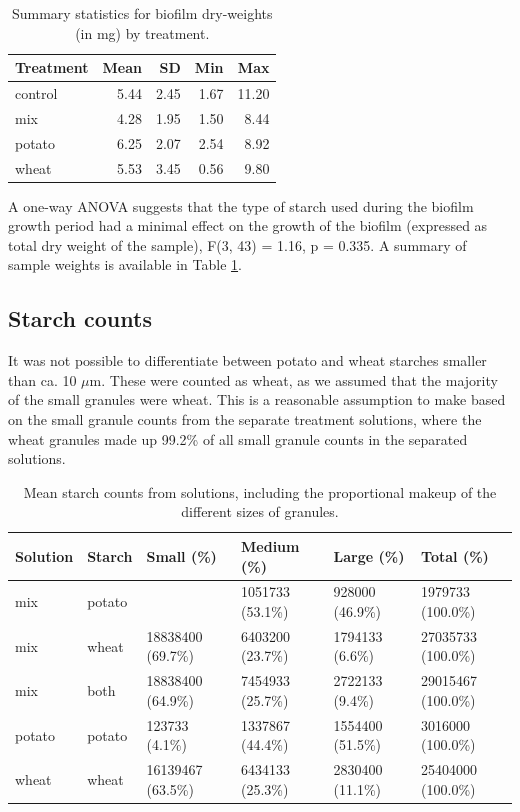 \documentclass[
]{article}
\begin{document}
\begin{table}

\caption{\label{tab:anova-tbl}Summary statistics for biofilm dry-weights (in mg) by treatment.}
\centering
\begin{tabular}[t]{l|r|r|r|r}
\hline
Treatment & Mean & SD & Min & Max\\
\hline
control & 5.44 & 2.45 & 1.67 & 11.20\\
\hline
mix & 4.28 & 1.95 & 1.50 & 8.44\\
\hline
potato & 6.25 & 2.07 & 2.54 & 8.92\\
\hline
wheat & 5.53 & 3.45 & 0.56 & 9.80\\
\hline
\end{tabular}
\end{table}

A one-way ANOVA suggests that the type of starch used during the biofilm
growth period had a minimal effect on the growth of the biofilm
(expressed as total dry weight of the sample), F(3, 43)
= 1.16, p = 0.335.
A summary of sample weights is available in Table \ref{tab:anova-tbl}.

\hypertarget{starch-counts}{%
\subsection{Starch counts}\label{starch-counts}}

It was not possible to differentiate between potato and
wheat starches smaller than ca. 10 \(\mu\)m. These were counted as wheat,
as we assumed that the majority of the small granules were wheat. This is a
reasonable assumption to make based on the small granule counts from the separate
treatment solutions, where the wheat granules made up
99.2\%
of all small granule counts in the separated solutions.

\begin{table}

\caption{\label{tab:solution-count-tbl}Mean starch counts from solutions, including the
             proportional makeup of the different sizes of granules.}
\centering
\begin{tabular}[t]{l|l|l|l|l|l}
\hline
Solution & Starch & Small (\%) & Medium (\%) & Large (\%) & Total (\%)\\
\hline
mix & potato &  & 1051733 (53.1\%) & 928000 (46.9\%) & 1979733 (100.0\%)\\
\hline
mix & wheat & 18838400 (69.7\%) & 6403200 (23.7\%) & 1794133 (6.6\%) & 27035733 (100.0\%)\\
\hline
mix & both & 18838400 (64.9\%) & 7454933 (25.7\%) & 2722133 (9.4\%) & 29015467 (100.0\%)\\
\hline
potato & potato & 123733 (4.1\%) & 1337867 (44.4\%) & 1554400 (51.5\%) & 3016000 (100.0\%)\\
\hline
wheat & wheat & 16139467 (63.5\%) & 6434133 (25.3\%) & 2830400 (11.1\%) & 25404000 (100.0\%)\\
\hline
\end{tabular}
\end{table}
\end{document}
